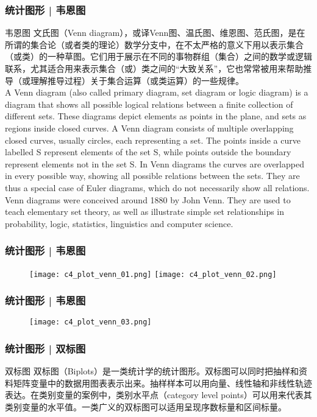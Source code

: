 \begin{frame}
  \frametitle{统计图形 | 韦恩图}
  \begin{block}{韦恩图}
    {\footnotesize
      文氏图（Venn diagram），或译Venn图、温氏图、维恩图、范氏图，是在所谓的集合论（或者类的理论）数学分支中，在不太严格的意义下用以表示集合（或类）的一种草图。它们用于展示在不同的事物群组（集合）之间的数学或逻辑联系，尤其\alert{适合用来表示集合（或）类之间的“大致关系”}，它也常常被用来帮助推导（或理解推导过程）关于集合运算（或类运算）的一些规律。\\
    \vspace{0.5em}
    A Venn diagram (also called primary diagram, set diagram or logic diagram) is a diagram that shows all possible logical relations between a finite collection of different sets. These diagrams depict elements as points in the plane, and sets as regions inside closed curves. A Venn diagram consists of multiple overlapping closed curves, usually circles, each representing a set. The points inside a curve labelled S represent elements of the set S, while points outside the boundary represent elements not in the set S. In Venn diagrams the curves are overlapped in every possible way, showing all possible relations between the sets. They are thus a special case of Euler diagrams, which do not necessarily show all relations. Venn diagrams were conceived around 1880 by John Venn. They are used to teach elementary set theory, as well as illustrate simple set relationships in probability, logic, statistics, linguistics and computer science.\\
  }
  \end{block}
\end{frame}

\begin{frame}
  \frametitle{统计图形 | 韦恩图}
  \begin{figure}
    \centering
    \texttt{[image: c4\_plot\_venn\_01.png]}
    \texttt{[image: c4\_plot\_venn\_02.png]}
  \end{figure}
\end{frame}

\begin{frame}
  \frametitle{统计图形 | 韦恩图}
  \begin{figure}
    \centering
    \texttt{[image: c4\_plot\_venn\_03.png]}
  \end{figure}
\end{frame}

\begin{frame}
  \frametitle{统计图形 | 双标图}
  \begin{block}{双标图}
双标图（Biplots）是一类统计学的统计图形。双标图可以同时把抽样和资料矩阵变量中的数据用图表表示出来。抽样样本可以用向量、线性轴和非线性轨迹表达。在类别变量的案例中，类别水平点（category level points）可以用来代表其类别变量的水平值。一类广义的双标图可以适用呈现序数标量和区间标量。
  \end{block}
\end{frame}

